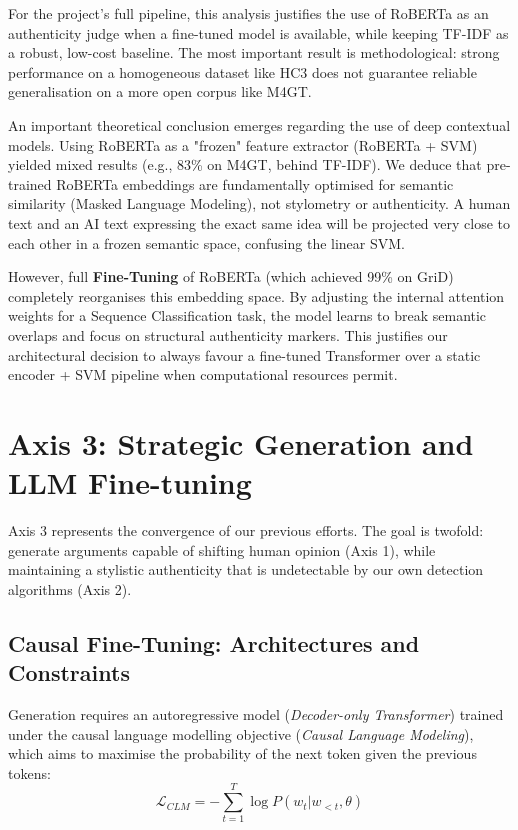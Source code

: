 \documentclass[11pt,a4paper]{article}
\begin{document}
For the project's full pipeline, this analysis justifies the use of RoBERTa
as an authenticity judge when a fine-tuned model is available, while keeping
TF-IDF as a robust, low-cost baseline. The most important result is methodological:
strong performance on a homogeneous dataset like HC3 does not guarantee reliable
generalisation on a more open corpus like M4GT.

An important theoretical conclusion emerges regarding the use of deep contextual models. Using RoBERTa as a "frozen" feature extractor (RoBERTa + SVM) yielded mixed results (e.g., 83\% on M4GT, behind TF-IDF). We deduce that pre-trained RoBERTa embeddings are fundamentally optimised for semantic similarity (Masked Language Modeling), not stylometry or authenticity. A human text and an AI text expressing the exact same idea will be projected very close to each other in a frozen semantic space, confusing the linear SVM.

However, full \textbf{Fine-Tuning} of RoBERTa (which achieved 99\% on GriD) completely reorganises this embedding space. By adjusting the internal attention weights for a Sequence Classification task, the model learns to break semantic overlaps and focus on structural authenticity markers. This justifies our architectural decision to always favour a fine-tuned Transformer over a static encoder + SVM pipeline when computational resources permit.

\newpage

\section{Axis 3: Strategic Generation and LLM Fine-tuning}

Axis 3 represents the convergence of our previous efforts. The goal is twofold:
generate arguments capable of shifting human opinion (Axis 1), while
maintaining a stylistic authenticity that is undetectable by our own detection
algorithms (Axis 2).

\subsection{Causal Fine-Tuning: Architectures and Constraints}
Generation requires an autoregressive model (\textit{Decoder-only Transformer})
trained under the causal language modelling objective (\textit{Causal Language
Modeling}), which aims to maximise the probability of the next token given the
previous tokens:
\begin{equation}
    \mathcal{L}_{CLM} = -\sum_{t=1}^T \log P(w_t | w_{<t}, \theta)
\end{equation}
\end{document}
